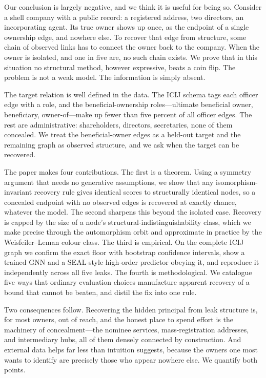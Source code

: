 \documentclass[sigconf]{acmart}
\begin{document}
Our conclusion is largely negative, and we think it is useful for being so.
Consider a shell company with a public record: a registered address, two
directors, an incorporating agent. Its true owner shows up once, as the endpoint
of a single ownership edge, and nowhere else. To recover that edge from
structure, some chain of observed links has to connect the owner back to the
company. When the owner is isolated, and one in five are, no such chain exists.
We prove that in this situation no structural method, however expressive, beats a
coin flip. The problem is not a weak model. The information is simply absent.

The target relation is well defined in the data. The ICIJ schema tags each
officer edge with a role, and the beneficial-ownership roles---ultimate
beneficial owner, beneficiary, owner-of---make up fewer than five percent of all
officer edges. The rest are administrative: shareholders, directors,
secretaries, none of them concealed. We treat the beneficial-owner edges as a
held-out target and the remaining graph as observed structure, and we ask when
the target can be recovered.

The paper makes four contributions. The first is a theorem. Using a
symmetry argument that needs no generative assumptions, we show that any
isomorphism-invariant recovery rule gives identical scores to structurally
identical nodes, so a concealed endpoint with no observed edges is recovered at
exactly chance, whatever the model. The second sharpens this beyond the isolated
case. Recovery is capped by the size of a node's structural-indistinguishability
class, which we make precise through the automorphism orbit and approximate in
practice by the Weisfeiler--Leman colour class. The third is empirical. On the
complete ICIJ graph we confirm the exact floor with bootstrap confidence
intervals, show a trained GNN and a SEAL-style high-order predictor obeying it,
and reproduce it independently across all five leaks. The fourth is
methodological. We catalogue five ways that ordinary evaluation choices
manufacture apparent recovery of a bound that cannot be beaten, and distil the
fix into one rule.

Two consequences follow. Recovering the hidden principal from leak structure is,
for most owners, out of reach, and the honest place to spend effort is the
machinery of concealment---the nominee services, mass-registration addresses, and
intermediary hubs, all of them densely connected by construction. And external
data helps far less than intuition suggests, because the owners one most wants to
identify are precisely those who appear nowhere else. We quantify both points.
\end{document}
